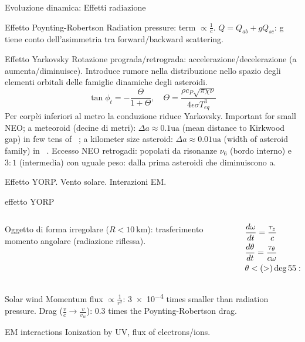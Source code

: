 \begin{wordonframe}{Evoluzione dinamica: Effetti radiazione}
\begin{block}{Effetto Poynting-Robertson}
Radiation pressure: term $\propto\frac{1}{c}$.
$Q=Q_{ab}+gQ_{sc}$: g tiene conto dell'asimmetria tra forward/backward scattering.
\end{block}
\begin{block}{Effetto Yarkovsky}
Rotazione prograda/retrograda: accelerazione/decelerazione (a aumenta/diminuisce). Introduce rumore nella distribuzione nello spazio degli elementi orbitali delle famiglie dinamiche degli asteroidi.
\begin{equation*}
\tan{\phi_t}=-\frac{\Theta}{1+\Theta},\quad \Theta=\frac{\rho c_P\sqrt{\pi\chi\nu}}{4\epsilon\sigma T_{eq}^3}
\end{equation*}
Per corpèi inferiori al metro la conduzione riduce Yarkovsky.
Important for small NEO; a meteoroid (decine di metri): $\Delta a\approx 0.1\si{\astronomicalunit}$ (mean distance to Kirkwood gap) in few tens of \si{\mega\year}; a kilometer size asteroid: $\Delta a\approx 0.01\si{\astronomicalunit}$ (width of asteroid family) in \si{\giga\year}.
Eccesso NEO retrogadi: popolati da risonanze $\nu_6$ (bordo interno) e $3:1$ (intermedia) con uguale peso: dalla prima asteroidi che diminuiscono a.
\end{block}
\end{wordonframe}

\begin{frame}{Effetto YORP. Vento solare. Interazioni EM.}
\begin{block}{effetto YORP}\end{block}
\begin{columns}[T]\begin{column}{0.5\textwidth}
Oggetto di forma irregolare ($R<\SI{10}{\kilo\meter}$): trasferimento momento angolare (radiazione riflessa).
\end{column}
\begin{column}{0.5\textwidth}
\begin{align*}
&\frac{d \omega}{d t}=\frac{\tau_z}{c}\\
&\frac{d \theta}{d t}=\frac{\tau_{\theta}}{c\omega}\\
&\theta<(>)\deg{55}: \omega \uparrow(\downarrow)
\end{align*}
\end{column}  \end{columns}
\begin{block}{Solar wind}
Momentum flux $\propto\frac{1}{r^2}$: \num{3e-4} times smaller than radiation pressure. Drag ($\frac{v}{c}\to\frac{v}{v_w}$): $0.3$ times the Poynting-Robertson drag.
\end{block}
\begin{block}{EM interactions}
Ionization by UV, flux of electrons/ions. 
\end{block}
\end{frame}


